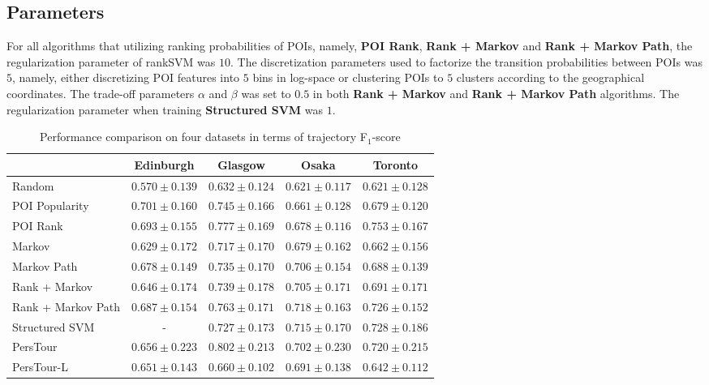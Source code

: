 \subsection{Parameters}
For all algorithms that utilizing ranking probabilities of POIs, namely, \textbf{POI Rank}, \textbf{Rank + Markov} and 
\textbf{Rank + Markov Path}, the regularization parameter of rankSVM was $10$.
The discretization parameters used to factorize the transition probabilities between POIs was $5$, namely,
either discretizing POI features into $5$ bins in log-space or clustering POIs to $5$ clusters according to the geographical coordinates.
The trade-off parameters $\alpha$ and $\beta$ was set to $0.5$ in both \textbf{Rank + Markov} and \textbf{Rank + Markov Path} algorithms.
The regularization parameter when training \textbf{Structured SVM} was $1$.


\begin{table*}
\centering
\begin{tabular}{l|cccc} \hline
 & Edinburgh & Glasgow & Osaka & Toronto \\ \hline
Random & $0.570\pm0.139$ & $0.632\pm0.124$ & $0.621\pm0.117$ & $0.621\pm0.128$ \\
POI Popularity & $0.701\pm0.160$ & $0.745\pm0.166$ & $0.661\pm0.128$ & $0.679\pm0.120$ \\
POI Rank & $0.693\pm0.155$ & $0.777\pm0.169$ & $0.678\pm0.116$ & $\mathbf{0.753\pm0.167}$ \\
Markov & $0.629\pm0.172$ & $0.717\pm0.170$ & $0.679\pm0.162$ & $0.662\pm0.156$ \\
Markov Path & $0.678\pm0.149$ & $0.735\pm0.170$ & $0.706\pm0.154$ & $0.688\pm0.139$ \\
Rank + Markov & $0.646\pm0.174$ & $0.739\pm0.178$ & $0.705\pm0.171$ & $0.691\pm0.171$ \\
Rank + Markov Path & $0.687\pm0.154$ & $0.763\pm0.171$ & $\mathbf{0.718\pm0.163}$ & $0.726\pm0.152$ \\
Structured SVM & - & $0.727\pm0.173$ & $0.715\pm0.170$ & $0.728\pm0.186$ \\
PersTour\cite{ijcai15} & $0.656\pm0.223$ & $\mathbf{0.802\pm0.213}$ & $0.702\pm0.230$ & $0.720\pm0.215$ \\
PersTour-L & $0.651\pm0.143$ & $0.660\pm0.102$ & $0.691\pm0.138$ & $0.642\pm0.112$ \\
\hline
\end{tabular}
\caption{Performance comparison on four datasets in terms of trajectory F$_1$-score}
\label{table:f1}
\end{table*}


